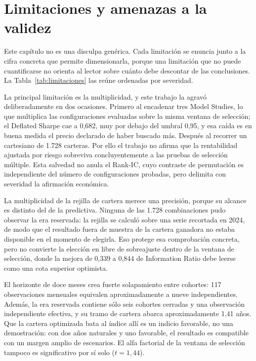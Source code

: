 \chapter{Limitaciones y amenazas a la validez}
\label{chap:limitaciones}

Este capítulo no es una disculpa genérica. Cada limitación se enuncia junto a la cifra concreta que
permite dimensionarla, porque una limitación que no puede cuantificarse no orienta al lector sobre
cuánto debe descontar de las conclusiones. La Tabla~\ref{tab:limitaciones} las reúne ordenadas por
severidad.

\begin{table}[H]
  \centering
  \footnotesize
  \caption{Limitaciones, evidencia que las cuantifica y severidad asignada.}
  \label{tab:limitaciones}
  
  \caption*{La severidad es un juicio del autor sobre cuánto condiciona cada limitación las
  conclusiones, no una medida estadística.}
\end{table}

La principal limitación es la multiplicidad, y este trabajo la agravó deliberadamente en dos
ocasiones. Primero al encadenar tres Model Studies, lo que multiplica las configuraciones evaluadas
sobre la misma ventana de selección; el Deflated Sharpe cae a 0,682, muy por debajo del umbral 0,95,
y esa caída es en buena medida el precio declarado de haber buscado más. Después al recorrer un
cartesiano de 1.728 carteras. Por ello el trabajo no afirma que la rentabilidad ajustada por riesgo
sobreviva concluyentemente a las pruebas de selección múltiple. Esta salvedad no anula el Rank-IC,
cuyo contraste de permutación es independiente del número de configuraciones probadas, pero delimita
con severidad la afirmación económica.

La multiplicidad de la rejilla de cartera merece una precisión, porque su alcance es distinto del de
la predictiva. Ninguna de las 1.728 combinaciones pudo observar la era reservada: la rejilla se
calculó sobre una serie recortada en 2024, de modo que el resultado fuera de muestra de la cartera
ganadora no estaba disponible en el momento de elegirla. Eso protege esa comprobación concreta, pero
no convierte la elección en libre de sobreajuste dentro de la ventana de selección, donde la mejora
de 0,339 a 0,844 de Information Ratio debe leerse como una cota superior optimista.

El horizonte de doce meses crea fuerte solapamiento entre cohortes: 117 observaciones mensuales
equivalen aproximadamente a nueve independientes. Además, la era reservada contiene sólo seis
cohortes cerradas y una observación independiente efectiva, y su tramo de cartera abarca
aproximadamente 1,41 años. Que la cartera optimizada bata al índice allí es un indicio favorable,
no una demostración: con dos años naturales y uno favorable, el resultado es compatible con un
margen amplio de escenarios. El alfa factorial de la ventana de selección tampoco es significativo
por sí solo ($t=1,44$).

